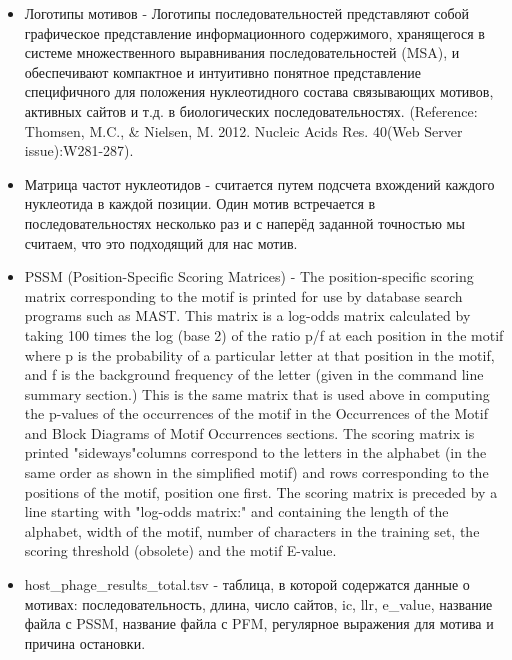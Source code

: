 \documentclass[14pt]{extarticle}
\begin{document}
\begin{itemize}
    \item Логотипы мотивов - Логотипы последовательностей представляют собой графическое представление информационного
    содержимого, хранящегося в системе множественного выравнивания последовательностей (MSA), и обеспечивают
    компактное и интуитивно понятное представление специфичного для положения нуклеотидного состава связывающих
    мотивов, активных сайтов и т.д. в биологических последовательностях. (Reference: Thomsen, M.C., \& Nielsen, M.
    2012. Nucleic Acids Res. 40(Web Server issue):W281-287).
   
    \item Матрица частот нуклеотидов - считается путем подсчета вхождений каждого нуклеотида в каждой позиции. Один 
    мотив встречается в последовательностях несколько раз и с наперёд заданной точностью мы считаем, что это подходящий 
    для нас мотив.
    
    \item PSSM (Position-Specific Scoring Matrices) - The position-specific scoring matrix corresponding to the motif
    is printed for use by database search programs such as MAST. This matrix is a log-odds matrix calculated by taking
    100 times the log (base 2) of the ratio p/f at each position in the motif where p is the probability of a
    particular letter at that position in the motif, and f is the background frequency of the letter (given in the
    command line summary section.) This is the same matrix that is used above in computing the p-values of the
    occurrences of the motif in the Occurrences of the Motif and Block Diagrams of Motif Occurrences sections. The
    scoring matrix is printed "sideways"\-\-columns correspond to the letters in the alphabet (in the same order as
    shown in the simplified motif) and rows corresponding to the positions of the motif, position one first. The
    scoring matrix is preceded by a line starting with "log-odds matrix:" and containing the length of the alphabet,
    width of the motif, number of characters in the training set, the scoring threshold (obsolete) and the motif
    E-value. \cite{memeres} 
    
    \item host\_phage\_results\_total.tsv - таблица, в которой содержатся данные о мотивах: последовательность, длина, 
    число сайтов, ic, llr, e\_value, название файла с PSSM, название файла с PFM, регулярное выражения для мотива и 
    причина остановки.
\end{itemize}
\end{document}
